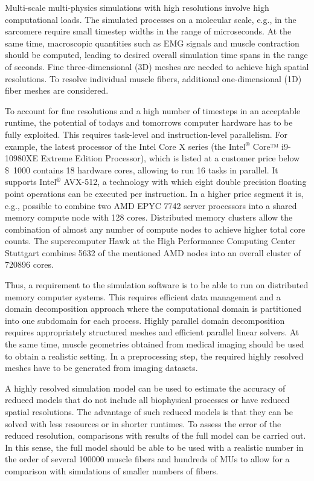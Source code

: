 Multi-scale multi-physics simulations with high resolutions involve high computational loads. The simulated processes on a molecular scale, e.g., in the sarcomere require small timestep widths in the range of microseconds. At the same time, macroscopic quantities such as EMG signals and muscle contraction should be computed, leading to desired overall simulation time spans in the range of seconds.
Fine three-dimensional (3D) meshes are needed to achieve high spatial resolutions. To resolve individual muscle fibers, additional one-dimensional (1D) fiber meshes are considered.

To account for fine resolutions and a high number of timesteps in an acceptable runtime, the potential of todays and tomorrows computer hardware has to be fully exploited. This requires task-level and instruction-level parallelism. For example, the latest processor of the Intel Core X series (the Intel${}^\text{®}$ Core™ i9-10980XE Extreme Edition Processor), which is listed at a customer price below \SI{1000}[\$]{} contains 18 hardware cores, allowing to run 16 tasks in parallel. It supports Intel${}^\text{®}$ AVX-512, a technology with which eight double precision floating point operations can be executed per instruction. 
In a higher price segment it is, e.g., possible to combine two AMD EPYC 7742 server processors into a shared memory compute node with \num{128} cores. Distributed memory clusters allow the combination of almost any number of compute nodes to achieve higher total core counts. The supercomputer Hawk at the High Performance Computing Center Stuttgart combines \num{5632} of the mentioned AMD nodes into an overall cluster of \num{720896} cores.

Thus, a requirement to the simulation software is to be able to run on distributed memory computer systems. This requires efficient data management and a domain decomposition approach where the computational domain is partitioned into one subdomain for each process.
Highly parallel domain decomposition requires appropriately structured meshes and efficient parallel linear solvers. At the same time, muscle geometries obtained from medical imaging should be used to obtain a realistic setting. In a preprocessing step, the required highly resolved meshes have to be generated from imaging datasets.

A highly resolved simulation model can be used to estimate the accuracy of reduced models that do not include all biophysical processes or have reduced spatial resolutions. The advantage of such reduced models is that they can be solved with less resources or in shorter runtimes. To assess the error of the reduced resolution, comparisons with results of the full model can be carried out. In this sense, the full model should be able to be used with a realistic number in the order of several \num{100000} muscle fibers and hundreds of MUs to allow for a comparison with simulations of smaller numbers of fibers.

